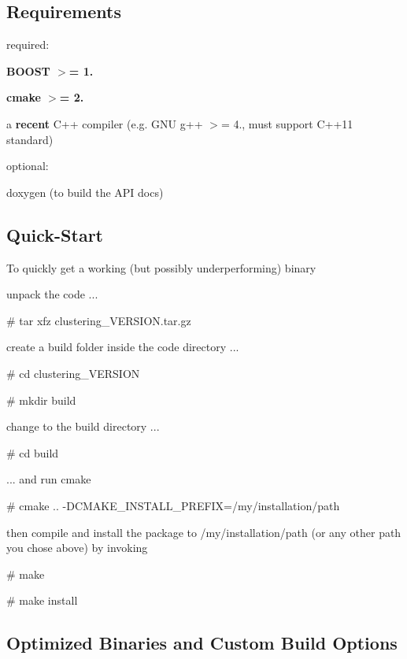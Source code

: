 \subsection*{Requirements}

required\-:
\begin{DoxyItemize}
\item {\bfseries B\-O\-O\-S\-T $>$= 1.}
\item {\bfseries cmake $>$= 2.}
\item a {\bfseries recent} C++ compiler (e.\-g. G\-N\-U g++ $>$= 4., must support C++11 standard)
\end{DoxyItemize}

optional\-:
\begin{DoxyItemize}
\item doxygen (to build the A\-P\-I docs)
\end{DoxyItemize}

\subsection*{Quick-\/\-Start}

To quickly get a working (but possibly underperforming) binary


\begin{DoxyItemize}
\item unpack the code ...

\# tar xfz clustering\-\_\-\-V\-E\-R\-S\-I\-O\-N.\-tar.\-gz
\item create a build folder inside the code directory ...

\# cd clustering\-\_\-\-V\-E\-R\-S\-I\-O\-N

\# mkdir build
\item change to the build directory ...

\# cd build
\item ... and run cmake

\# cmake .. -\/\-D\-C\-M\-A\-K\-E\-\_\-\-I\-N\-S\-T\-A\-L\-L\-\_\-\-P\-R\-E\-F\-I\-X=/my/installation/path
\item then compile and install the package to /my/installation/path (or any other path you chose above) by invoking

\# make

\# make install
\end{DoxyItemize}

\subsection*{Optimized Binaries and Custom Build Options}

